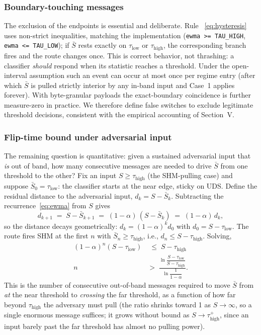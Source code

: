 \documentclass[conference]{IEEEtran}
\newcommand{\taulow}{\tau_{\mathrm{low}}}
\newcommand{\tauhigh}{\tau_{\mathrm{high}}}
\newcommand{\sbar}{\bar{S}}
\begin{document}
\subsubsection{Boundary-touching messages}
The exclusion of the endpoints is essential and deliberate. Rule~%
\eqref{eq:hysteresis} uses non-strict inequalities, matching the
implementation (\texttt{ewma >= TAU\_HIGH}, \texttt{ewma <= TAU\_LOW}); if
$\sbar$ rests exactly on $\taulow$ or $\tauhigh$, the corresponding branch
fires and the route changes once. This is correct behavior, not thrashing: a
classifier \emph{should} respond when its statistic reaches a threshold.
Under the open-interval assumption such an event can occur at most once per
regime entry (after which $\sbar$ is pulled strictly interior by any
in-band input and Case~1 applies forever). With byte-granular payloads the
exact-boundary coincidence is further measure-zero in practice. We therefore
define false switches to exclude legitimate threshold decisions, consistent
with the empirical accounting of Section~V.

\subsubsection{Flip-time bound under adversarial input}
The remaining question is quantitative: given a sustained adversarial input
that \emph{is} out of band, how many consecutive messages are needed to
drive $\sbar$ from one threshold to the other? Fix an input
$S \geq \tauhigh$ (the SHM-pulling case) and suppose $\sbar_0 = \taulow$:
the classifier starts at the near edge, sticky on UDS. Define the residual
distance to the adversarial input, $d_k = S - \sbar_k$. Subtracting the
recurrence~\eqref{eq:ewma} from $S$ gives
\begin{equation}
d_{k+1} \;=\; S - \sbar_{k+1}
        \;=\; (1-\alpha)\,(S - \sbar_k) \;=\; (1-\alpha)\, d_k,
\end{equation}
so the distance decays geometrically: $d_k = (1-\alpha)^k d_0$ with
$d_0 = S - \taulow$. The route fires SHM at the first $n$ with
$\sbar_n \geq \tauhigh$, i.e., $d_n \leq S - \tauhigh$. Solving,
\begin{align}
(1-\alpha)^n (S - \taulow) &\;\leq\; S - \tauhigh \nonumber\\
n \;&>\;
\frac{\ln\dfrac{S - \taulow}{S - \tauhigh}}{\ln\dfrac{1}{1-\alpha}}.
\label{eq:flipbound}
\end{align}
This is the number of consecutive out-of-band messages required to move
$\sbar$ from \emph{at} the near threshold to \emph{crossing} the far
threshold, as a function of how far beyond $\tauhigh$ the adversary must
pull (the ratio shrinks toward 1 as $S \to \infty$, so a single enormous
message suffices; it grows without bound as $S \to \tauhigh^{+}$, since an
input barely past the far threshold has almost no pulling power).
\end{document}

